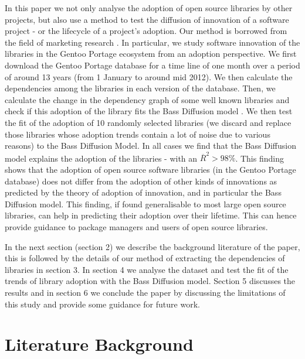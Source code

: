 \documentclass[smallextended,final]{svjour3}
\begin{document}
In this paper we not only analyse the adoption of open source libraries by other projects, but also use a method to test the diffusion of innovation of a software project - or the lifecycle of a project's adoption. Our method is borrowed from the field of marketing research \citep{bass69}. In particular, we study  software innovation of the libraries in the Gentoo Portage  ecosystem from an adoption perspective. We first download the Gentoo Portage database for a time line of one month over a period of around 13 years (from 1 January to around mid 2012). We then calculate the dependencies among the libraries in each version of the database. Then, we calculate the change in the dependency graph of some well known libraries and check if this adoption of the library fits the Bass Diffusion model \citep{bass69}. We then test the fit of the adoption of 10 randomly selected libraries (we discard and replace those libraries whose adoption trends contain a lot of noise due to various reasons) to the Bass Diffusion Model. In all cases we find that the Bass Diffusion model explains the adoption of the libraries - with an $\overline{R}^2 > 98\%$. This finding shows that the adoption of open source software libraries (in the Gentoo Portage database) does not differ from the adoption of other kinds of innovations as predicted by the theory of adoption of innovation, and in particular the Bass Diffusion model. This finding, if found generalisable to most large open source libraries, can help in predicting their adoption over their lifetime. This can hence provide guidance to package managers and users of open source libraries.



In the next section (section 2)  we describe the background literature of the paper, this is followed by the details of our method of extracting the dependencies of libraries in section 3. In section 4 we analyse the dataset and test the fit of the trends of library adoption with the Bass Diffusion model. Section 5 discusses the results and in section 6 we conclude the paper by discussing the limitations of this study and provide some guidance for future work.
 


\section{Literature Background}
\end{document}
